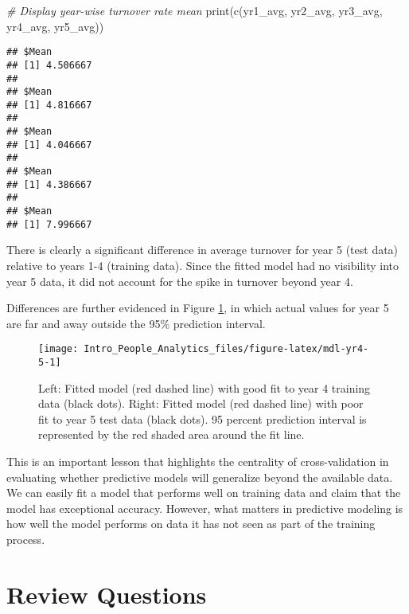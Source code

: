 \documentclass[
]{book}
\newenvironment{Shaded}{\begin{snugshade}}{\end{snugshade}}
\newcommand{\CommentTok}[1]{\textcolor[rgb]{0.56,0.35,0.01}{\textit{#1}}}
\newcommand{\FunctionTok}[1]{\textcolor[rgb]{0.00,0.00,0.00}{#1}}
\newcommand{\NormalTok}[1]{#1}
\begin{document}
\begin{Shaded}
\begin{Highlighting}[]
\CommentTok{\# Display year{-}wise turnover rate mean}
\FunctionTok{print}\NormalTok{(}\FunctionTok{c}\NormalTok{(yr1\_avg, yr2\_avg, yr3\_avg, yr4\_avg, yr5\_avg))}
\end{Highlighting}
\end{Shaded}

\begin{verbatim}
## $Mean
## [1] 4.506667
## 
## $Mean
## [1] 4.816667
## 
## $Mean
## [1] 4.046667
## 
## $Mean
## [1] 4.386667
## 
## $Mean
## [1] 7.996667
\end{verbatim}

There is clearly a significant difference in average turnover for year 5 (test data) relative to years 1-4 (training data). Since the fitted model had no visibility into year 5 data, it did not account for the spike in turnover beyond year 4.

Differences are further evidenced in Figure \ref{fig:mdl-yr4-5}, in which actual values for year 5 are far and away outside the 95\% prediction interval.

\begin{figure}

{\centering \texttt{[image: Intro\_People\_Analytics\_files/figure-latex/mdl-yr4-5-1]} 

}

\caption{Left: Fitted model (red dashed line) with good fit to year 4 training data (black dots). Right: Fitted model (red dashed line) with poor fit to year 5 test data (black dots). 95 percent prediction interval is represented by the red shaded area around the fit line.}\label{fig:mdl-yr4-5}
\end{figure}

This is an important lesson that highlights the centrality of cross-validation in evaluating whether predictive models will generalize beyond the available data. We can easily fit a model that performs well on training data and claim that the model has exceptional accuracy. However, what matters in predictive modeling is how well the model performs on data it has not seen as part of the training process.

\hypertarget{review-questions-10}{%
\section{Review Questions}\label{review-questions-10}}
\end{document}
